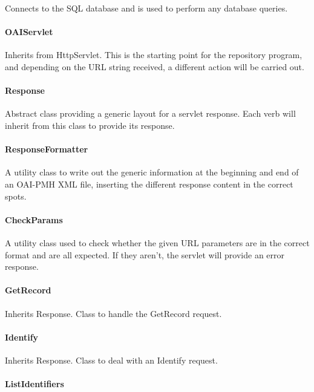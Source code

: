 \documentclass[a4paper,11pt]{article}
\begin{document}
Connects to the SQL database and is used to perform any database queries.

\paragraph{OAIServlet}

Inherits from HttpServlet. This is the starting point for the repository program, and depending on the URL string received, a different action will be carried out.

\paragraph{Response}

Abstract class providing a generic layout for a servlet response. Each verb will inherit from this class to provide its response.

\paragraph{ResponseFormatter}

A utility class to write out the generic information at the beginning and end of an OAI-PMH XML file, inserting the different response content in the correct spots.

\paragraph{CheckParams}

A utility class used to check whether the given URL parameters are in the correct format and are all expected. If they aren't, the servlet will provide an error response.

\paragraph{GetRecord}

Inherits Response. Class to handle the GetRecord request.

\paragraph{Identify}

Inherits Response. Class to deal with an Identify request.

\paragraph{ListIdentifiers}
\end{document}
